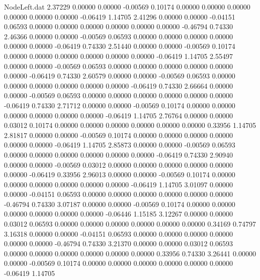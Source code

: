 \begin{filecontents}{NodeLeft.dat}
   2.37229    0.00000    0.00000    -0.00569    0.10174    0.00000    0.00000    0.00000    0.00000    0.00000    0.00000   -0.06419    1.14705
   2.41296    0.00000    0.00000    -0.04151    0.06593    0.00000    0.00000    0.00000    0.00000    0.00000    0.00000   -0.46794    0.74330
   2.46366    0.00000    0.00000    -0.00569    0.06593    0.00000    0.00000    0.00000    0.00000    0.00000    0.00000   -0.06419    0.74330
   2.51440    0.00000    0.00000    -0.00569    0.10174    0.00000    0.00000    0.00000    0.00000    0.00000    0.00000   -0.06419    1.14705
   2.55497    0.00000    0.00000    -0.00569    0.06593    0.00000    0.00000    0.00000    0.00000    0.00000    0.00000   -0.06419    0.74330
   2.60579    0.00000    0.00000    -0.00569    0.06593    0.00000    0.00000    0.00000    0.00000    0.00000    0.00000   -0.06419    0.74330
   2.66664    0.00000    0.00000    -0.00569    0.06593    0.00000    0.00000    0.00000    0.00000    0.00000    0.00000   -0.06419    0.74330
   2.71712    0.00000    0.00000    -0.00569    0.10174    0.00000    0.00000    0.00000    0.00000    0.00000    0.00000   -0.06419    1.14705
   2.76764    0.00000    0.00000     0.03012    0.10174    0.00000    0.00000    0.00000    0.00000    0.00000    0.00000    0.33956    1.14705
   2.81817    0.00000    0.00000    -0.00569    0.10174    0.00000    0.00000    0.00000    0.00000    0.00000    0.00000   -0.06419    1.14705
   2.85873    0.00000    0.00000    -0.00569    0.06593    0.00000    0.00000    0.00000    0.00000    0.00000    0.00000   -0.06419    0.74330
   2.90940    0.00000    0.00000    -0.00569    0.03012    0.00000    0.00000    0.00000    0.00000    0.00000    0.00000   -0.06419    0.33956
   2.96013    0.00000    0.00000    -0.00569    0.10174    0.00000    0.00000    0.00000    0.00000    0.00000    0.00000   -0.06419    1.14705
   3.01097    0.00000    0.00000    -0.04151    0.06593    0.00000    0.00000    0.00000    0.00000    0.00000    0.00000   -0.46794    0.74330
   3.07187    0.00000    0.00000    -0.00569    0.10174    0.00000    0.00000    0.00000    0.00000    0.00000    0.00000   -0.06446    1.15185
   3.12267    0.00000    0.00000     0.03012    0.06593    0.00000    0.00000    0.00000    0.00000    0.00000    0.00000    0.34169    0.74797
   3.16318    0.00000    0.00000    -0.04151    0.06593    0.00000    0.00000    0.00000    0.00000    0.00000    0.00000   -0.46794    0.74330
   3.21370    0.00000    0.00000     0.03012    0.06593    0.00000    0.00000    0.00000    0.00000    0.00000    0.00000    0.33956    0.74330
   3.26441    0.00000    0.00000    -0.00569    0.10174    0.00000    0.00000    0.00000    0.00000    0.00000    0.00000   -0.06419    1.14705

\end{filecontents}
